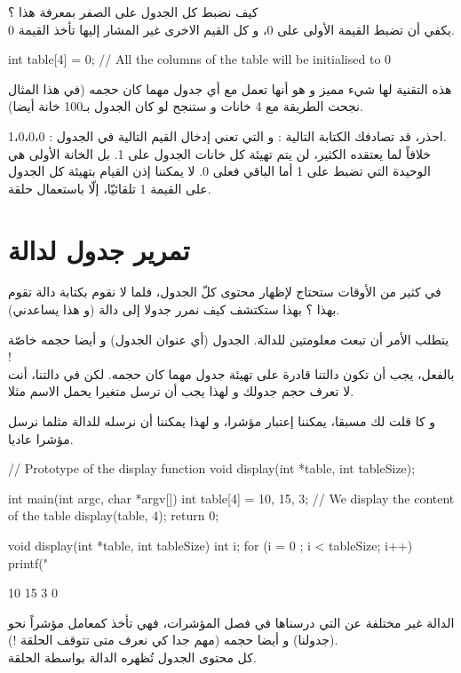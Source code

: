 كيف نضبط كل الجدول على الصفر بمعرفة هذا ؟\\
يكفي أن تضبط القيمة الأولى على 0، و كل القيم الاخرى غير المشار إليها تأخذ القيمة 0.

\begin{Csource}
int table[4] = {0}; // All the columns of the table will be initialised to 0
\end{Csource}

هذه التقنية لها شيء مميز و هو أنها تعمل مع أي جدول مهما كان حجمه (في هذا المثال نجحت الطريقة مع 4 خانات و ستنجح لو كان الجدول بـ100 خانة أيضا).

\begin{critical}
احذر، قد تصادفك الكتابة التالية :
و التي تعني إدخال القيم التالية في الجدول :
1،0،0،0.\\
خلافاً لما يعتقده الكثير، لن يتم تهيئة كل خانات الجدول على 1. بل الخانة الأولى هي الوحيدة التي تضبط على 1 أما الباقي فعلى 0. لا يمكننا إذن القيام بتهيئة كل الجدول على القيمة 1 تلقائيّا، إلّا باستعمال حلقة.
\end{critical}

\section{تمرير جدول لدالة}

في كثير من الأوقات ستحتاج لإظهار محتوى كلّ الجدول، فلما لا نقوم بكتابة دالة تقوم بهذا ؟ بهذا ستكتشف كيف نمرر جدولا إلى دالة (و هذا يساعدني).

يتطلب الأمر أن تبعث معلومتين للدالة. الجدول (أي عنوان الجدول) و أيضا حجمه خاصّة !\\
بالفعل، يجب أن تكون دالتنا قادرة على تهيئة جدول مهما كان حجمه. لكن في دالتنا، أنت لا تعرف حجم جدولك و لهذا يجب أن ترسل متغيرا يحمل الاسم
مثلا.

و كا قلت لك مسبقا، يمكننا إعتبار
مؤشرا، و لهذا يمكننا أن نرسله للدالة مثلما نرسل مؤشرا عاديا.
\begin{Csource}
// Prototype of the display function
void display(int *table, int tableSize);

int main(int argc, char *argv[])
{
	int table[4] = {10, 15, 3};
 	// We display the content of the table
	display(table, 4);
	return 0;
}

void display(int *table, int tableSize)
{
	int i;
	for (i = 0 ; i < tableSize; i++)
	{
    		printf("%
	}
}
\end{Csource}
\begin{Console}
10
15
3
0
\end{Console}
الدالة غير مختلفة عن التي درسناها في فصل المؤشرات، فهي تأخذ كمعامل مؤشراً نحو
(جدولنا) و أيضا حجمه (مهم جدا كي نعرف متى تتوقف الحلقة !).\\
كل محتوى الجدول تُظهره الدالة بواسطة الحلقة.

